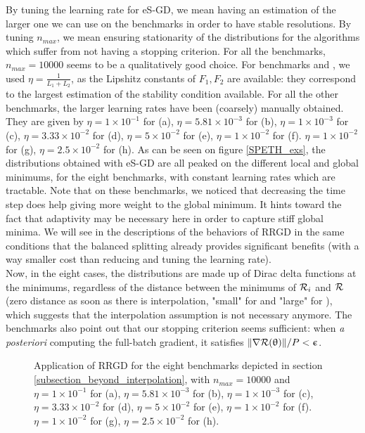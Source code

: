 \documentclass[article,authoryear,jmlmc]{beg_32}             %
\begin{document}
By tuning the learning rate for eS-GD, we mean having an estimation of the larger one we can use on the benchmarks in order to 
have stable resolutions. 
By tuning $n_{max}$, we mean ensuring stationarity of the distributions for the algorithms which suffer from not having a stopping criterion.
For all the benchmarks, $n_{max}=10000$ seems to be a qualitatively good choice. 
For benchmarks \exOne and \exTwo, we used $\eta=\frac{1}{L_1+L_2}$, as the Lipshitz constants of $F_1,F_2$ are available: they correspond to 
the largest estimation of the stability condition available. 
For all the other benchmarks, the larger learning rates have been (coarsely) manually obtained. They are given by 
 $\eta = 1   \times 10^{-1}$  for \exOne    (a), 
 $\eta = 5.81\times 10^{-3}$  for \exTwo    (b), 
 $\eta = 1   \times 10^{-3}$  for \exThree  (c), 
 $\eta = 3.33\times 10^{-2}$  for \exFour   (d), 
 $\eta = 5   \times 10^{-2}$  for \exFive   (e), 
 $\eta = 1   \times 10^{-2}$  for \exSix    (f). 
 $\eta = 1   \times 10^{-2}$  for \exSeven  (g), 
 $\eta = 2.5 \times 10^{-2}$  for \exHeight (h). 
As can be seen on figure \ref{SPETH_exs}, the distributions obtained with eS-GD are all peaked on the different local and global minimums, for the eight benchmarks, with
constant learning
rates which are tractable. 
Note that on these benchmarks, we noticed that decreasing the time step does help giving more weight to the global minimum. 
It hints toward the fact that adaptivity may be necessary here in order to capture stiff global minima.  
We will see in the descriptions of the behaviors of RRGD in the same conditions that the balanced splitting already provides significant benefits (with a way smaller cost
than reducing and tuning the learning rate). \\ 
Now, in the eight cases, the distributions are made up of Dirac delta functions at the minimums, regardless of the distance between the minimums of $\mathcal{R}_i$ and $\mathcal{R}$ (zero distance as
soon as there is interpolation, "small" for \exThree and "large" for \exFour), which suggests that the interpolation assumption is not necessary anymore. 
The benchmarks also point out that
our stopping criterion seems sufficient: when {\em a posteriori} computing the full-batch gradient, it satisfies $\|\nabla \mathcal{R}(\uptheta)\|/P<\upepsilon$. \\
\begin{figure}[h!]
	\centering
	\scalebox{0.60}{}
	\caption{
          Application of RRGD for the eight benchmarks depicted in section \ref{subsection_beyond_interpolation}, with $n_{max}=10000$ and 
 $\eta = 1   \times 10^{-1}$  for \exOne    (a), 
 $\eta = 5.81\times 10^{-3}$  for \exTwo    (b), 
 $\eta = 1   \times 10^{-3}$  for \exThree  (c), 
 $\eta = 3.33\times 10^{-2}$  for \exFour   (d), 
 $\eta = 5   \times 10^{-2}$  for \exFive   (e), 
 $\eta = 1   \times 10^{-2}$  for \exSix    (f). 
 $\eta = 1   \times 10^{-2}$  for \exSeven  (g), 
 $\eta = 2.5 \times 10^{-2}$  for \exHeight (h). 
}
	\label{SGD_exs_001}
\end{figure}
\end{document}
